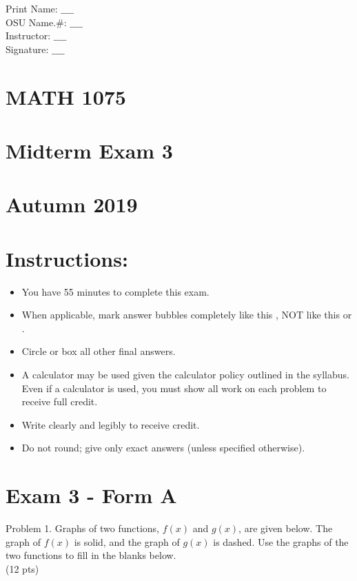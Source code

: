 \documentclass{ximera}
\begin{document}
\captionsetup{singlelinecheck=false}
Print Name: $\_\_\_\_$\\
OSU Name.\#: $\_\_\_\_$\\
Instructor: $\_\_\_\_$\\
Signature: $\_\_\_\_$

\section*{MATH 1075}
\section*{Midterm Exam 3}
\section*{Autumn 2019}
\section*{Instructions:}
\begin{itemize}
  \item You have 55 minutes to complete this exam.
  \item When applicable, mark answer bubbles completely like this , NOT like this or .
  \item Circle or box all other final answers.
  \item A calculator may be used given the calculator policy outlined in the syllabus. Even if a calculator is used, you must show all work on each problem to receive full credit.
  \item Write clearly and legibly to receive credit.
  \item Do not round; give only exact answers (unless specified otherwise).
\end{itemize}

\section*{Exam 3 - Form A}
Problem 1. Graphs of two functions, $f(x)$ and $g(x)$, are given below. The graph of $f(x)$ is solid, and the graph of $g(x)$ is dashed. Use the graphs of the two functions to fill in the blanks below.\\
(12 pts)\\
\end{document}
